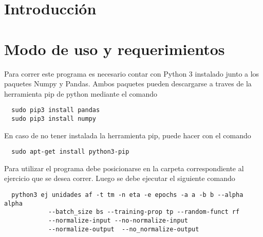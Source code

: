 \section{Introducción}


\section{Modo de uso y requerimientos}
Para correr este programa es necesario contar con Python 3 instalado junto a los paquetes Numpy y Pandas. Ambos paquetes pueden descargarse a traves
de la herramienta pip de python mediante el comando
\begin{verbatim}
  sudo pip3 install pandas
  sudo pip3 install numpy
\end{verbatim}
En caso de no tener instalada la herramienta pip, puede hacer con el comando
\begin{verbatim}
  sudo apt-get install python3-pip
\end{verbatim}

Para utilizar el programa debe posicionarse en la carpeta correspondiente al ejercicio que se desea correr. Luego se debe ejecutar el siguiente comando
\begin{verbatim}
  python3 ej unidades af -t tm -n eta -e epochs -a a -b b --alpha alpha
            --batch_size bs --training-prop tp --random-funct rf
            --normalize-input --no-normalize-input
            --normalize-output  --no_normalize-output
\end{verbatim}

